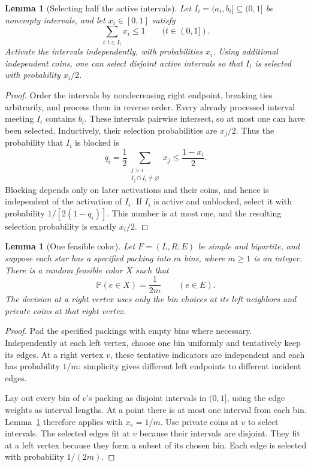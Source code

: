 \documentclass[11pt]{article}
\newtheorem{lemma}[theorem]{Lemma}
\theoremstyle{definition}\newtheorem{algorithm}{Algorithm}[section]
\numberwithin{equation}{section}
\theoremstyle{remark}\newtheorem*{remark}{Remark}
\begin{document}
\begin{lemma}[Selecting half the active intervals]
\label{lem:half-intervals}
Let $I_i=(a_i,b_i]\subseteq(0,1]$ be nonempty intervals, and let
$x_i\in[0,1]$ satisfy
\[
 \sum_{i:t\in I_i}x_i\le1\qquad(t\in(0,1]).
\]
Activate the intervals independently, with probabilities $x_i$.
Using additional independent coins, one can select disjoint active
intervals so that $I_i$ is selected with probability $x_i/2$.
\end{lemma}
\begin{proof}
Order the intervals by nondecreasing right endpoint, breaking ties
arbitrarily, and process them in reverse order. Every already processed
interval meeting $I_i$ contains $b_i$. These intervals pairwise intersect,
so at most one can have been selected. Inductively, their selection
probabilities are $x_j/2$. Thus the probability that $I_i$ is blocked is
\[
 q_i=\frac12\sum_{\substack{j>i\\I_j\cap I_i\ne\varnothing}}x_j
       \le\frac{1-x_i}{2}.
\]
Blocking depends only on later activations and their coins, and hence is
independent of the activation of $I_i$. If $I_i$ is active and unblocked,
select it with probability $1/[2(1-q_i)]$. This number is at most one,
and the resulting selection probability is exactly $x_i/2$.
\end{proof}

\begin{lemma}[One feasible color]\label{lem:one-color}
Let $F=(L,R;E)$ be simple and bipartite, and suppose each star has a
specified packing into $m$ bins, where $m\ge1$ is an integer.
There is a random feasible color $X$ such that
\[
 \mathbb P(e\in X)=\frac1{2m}\qquad(e\in E).
\]
The decision at a right vertex uses only the bin choices at its left
neighbors and private coins at that right vertex.
\end{lemma}
\begin{proof}
Pad the specified packings with empty bins where necessary.
Independently at each left vertex, choose one bin uniformly and
tentatively keep its edges. At a right vertex $v$, these tentative
indicators are independent and each has probability $1/m$: simplicity
gives different left endpoints to different incident edges.

Lay out every bin of $v$'s packing as disjoint intervals in $(0,1]$,
using the edge weights as interval lengths. At a point there is at most
one interval from each bin. Lemma~\ref{lem:half-intervals} therefore
applies with $x_e=1/m$. Use private coins at $v$ to select intervals.
The selected edges fit at $v$ because their intervals are disjoint.
They fit at a left vertex because they form a subset of its chosen bin.
Each edge is selected with probability $1/(2m)$.
\end{proof}
\end{document}
